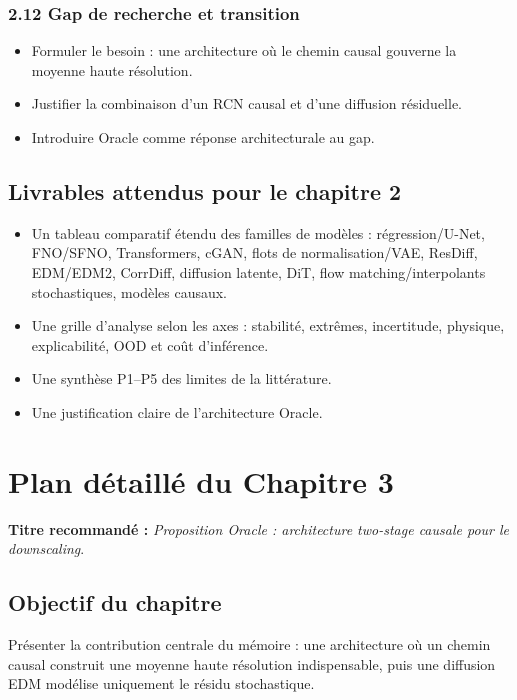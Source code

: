 \documentclass[12pt,a4paper]{article}
\begin{document}
\subsubsection*{2.12 Gap de recherche et transition}
\begin{itemize}
    \item Formuler le besoin : une architecture o\`u le chemin causal gouverne la moyenne haute r\'esolution.
    \item Justifier la combinaison d'un RCN causal et d'une diffusion r\'esiduelle.
    \item Introduire Oracle comme r\'eponse architecturale au gap.
\end{itemize}

\subsection*{Livrables attendus pour le chapitre 2}
\begin{itemize}
    \item Un tableau comparatif \'etendu des familles de mod\`eles : r\'egression/U-Net, FNO/SFNO, Transformers, cGAN, flots de normalisation/VAE, ResDiff, EDM/EDM2, CorrDiff, diffusion latente, DiT, flow matching/interpolants stochastiques, mod\`eles causaux.
    \item Une grille d'analyse selon les axes : stabilit\'e, extr\^emes, incertitude, physique, explicabilit\'e, OOD et co\^ut d'inf\'erence.
    \item Une synth\`ese P1--P5 des limites de la litt\'erature.
    \item Une justification claire de l'architecture Oracle.
\end{itemize}

\section{Plan d\'etaill\'e du Chapitre 3}
\textbf{Titre recommand\'e :} \emph{Proposition Oracle : architecture two-stage causale pour le downscaling}.

\subsection*{Objectif du chapitre}
Pr\'esenter la contribution centrale du m\'emoire : une architecture o\`u un chemin causal construit une moyenne haute r\'esolution indispensable, puis une diffusion EDM mod\'elise uniquement le r\'esidu stochastique.
\end{document}
